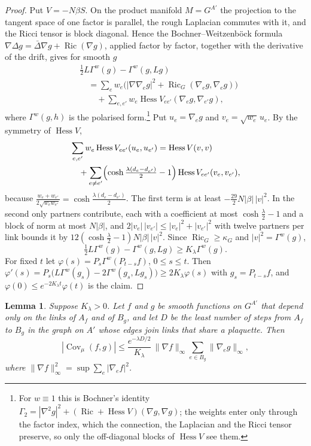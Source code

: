\documentclass[11pt]{amsart}
\newtheorem{lemma}[theorem]{Lemma}
\theoremstyle{definition}
\theoremstyle{remark}
\numberwithin{equation}{section}
\newcommand{\Hess}{\operatorname{Hess}}
\newcommand{\Ric}{\operatorname{Ric}}
\newcommand{\Cov}{\operatorname{Cov}}
\begin{document}
\begin{proof}
Put $V=-N\beta S$. On the product manifold $M=G^{A'}$ the projection to the
tangent space of one factor is parallel, the rough Laplacian commutes with
it, and the Ricci tensor is block diagonal. Hence the Bochner--Weitzenb\"ock
formula $\nabla\Delta g=\bar\Delta\nabla g+\Ric(\nabla g)$, applied factor by
factor, together with the derivative of the drift, gives for smooth $g$
\[
\begin{split}
&\tfrac12L\Gamma^w(g)-\Gamma^w(g,Lg)\\
&\quad=\sum_ew_e\bigl(|\nabla\nabla_eg|^2+\Ric_G(\nabla_eg,\nabla_eg)\bigr)\\
&\qquad+\sum_{e,e'}w_e\Hess V_{ee'}(\nabla_eg,\nabla_{e'}g),
\end{split}
\]
where $\Gamma^w(g,h)$ is the polarised form.\footnote{For $w\equiv1$ this is
Bochner's identity $\Gamma_2=|\nabla^2g|^2+(\Ric+\Hess V)(\nabla g,\nabla g)$;
the weights enter only through the factor index, which the connection, the
Laplacian and the Ricci tensor preserve, so only the off-diagonal blocks of
$\Hess V$ see them.} Put $u_e=\nabla_eg$ and $v_e=\sqrt{w_e}\,u_e$. By the
symmetry of $\Hess V$,
\[
\begin{split}
&\sum_{e,e'}w_e\Hess V_{ee'}(u_e,u_{e'})=\Hess V(v,v)\\
&\quad+\sum_{e\ne e'}\Bigl(\cosh\tfrac{\lambda(d_e-d_{e'})}2-1\Bigr)
\Hess V_{ee'}(v_e,v_{e'}),
\end{split}
\]
because $\frac{w_e+w_{e'}}{2\sqrt{w_ew_{e'}}}=\cosh\frac{\lambda(d_e-d_{e'})}2$. The
first term is at least $-\frac{29}2N|\beta|\,|v|^2$. In the second only
partners contribute, each with a coefficient at most $\cosh\frac\lambda2-1$
and a block of norm at most $N|\beta|$, and
$2|v_e|\,|v_{e'}|\le|v_e|^2+|v_{e'}|^2$ with twelve partners per link bounds it by
$12(\cosh\frac\lambda2-1)N|\beta|\,|v|^2$. Since $\Ric_G\ge\kappa_G$ and
$|v|^2=\Gamma^w(g)$,
\[
\tfrac12L\Gamma^w(g)-\Gamma^w(g,Lg)\ge K_\lambda\Gamma^w(g).
\]
For fixed $t$ let $\varphi(s)=P_s\Gamma^w(P_{t-s}f)$, $0\le s\le t$. Then
$\varphi'(s)=P_s\bigl(L\Gamma^w(g_s)-2\Gamma^w(g_s,Lg_s)\bigr)\ge2K_\lambda\varphi(s)$
with $g_s=P_{t-s}f$, and $\varphi(0)\le e^{-2K_\lambda t}\varphi(t)$ is the claim.
\end{proof}

\begin{lemma}\label{lem:decayrate}
Suppose $K_\lambda>0$. Let $f$ and $g$ be smooth functions on $G^{A'}$ that
depend only on the links of $A_f$ and of $B_g$, and let $D$ be the least
number of steps from $A_f$ to $B_g$ in the graph on $A'$ whose edges join
links that share a plaquette. Then
\[
|\Cov_\mu(f,g)|\le\frac{e^{-\lambda D/2}}{K_\lambda}\,\|\nabla f\|_\infty
\sum_{e\in B_g}\|\nabla_eg\|_\infty ,
\]
where $\|\nabla f\|_\infty^2=\sup\sum_e|\nabla_ef|^2$.
\end{lemma}
\end{document}
